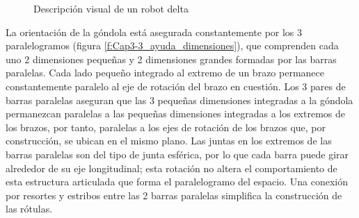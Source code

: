     \vspace{-1em}

    \begin{figure}[h]
         \centering
         \caption{Descripción visual de un robot delta \cite{Clavel:31403}}
    \end{figure}

    La orientación de la góndola está asegurada constantemente por los 3 paralelogramos (figura \ref{f:Cap3-3_ayuda_dimensiones}), que comprenden cada uno 2 dimensiones pequeñas y 2 dimensiones grandes formadas por las barras paralelas. Cada lado pequeño integrado al extremo de un brazo permanece constantemente paralelo al eje de rotación del brazo en cuestión. Los 3 pares de barras paralelas aseguran que las 3 pequeñas dimensiones integradas a la góndola permanezcan paralelas a las pequeñas dimensiones integradas a los extremos de los brazos, por tanto, paralelas a los ejes de rotación de los brazos que, por construcción, se ubican en el mismo plano. Las juntas en los extremos de las barras paralelas son del tipo de junta esférica, por lo que cada barra puede girar alrededor de su eje longitudinal; esta rotación no altera el comportamiento de esta estructura articulada que forma el paralelogramo del espacio. Una conexión por resortes y estribos entre las 2 barras paralelas simplifica la construcción de las rótulas.
    
